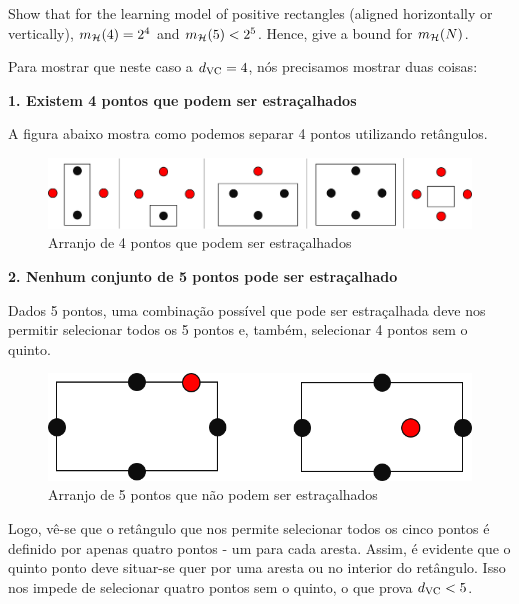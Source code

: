 \begin{enunciado}{2}
    Show that for the learning model of positive rectangles (aligned horizontally or vertically), $m_{\mathcal{H}}(4) = 2^4$ and $m_{\mathcal{H}}(5) < 2^5$. Hence, give a bound for $m_{\mathcal{H}}(N)$.
\end{enunciado}

Para mostrar que neste caso a $d_{\text{VC}} = 4$, nós precisamos mostrar duas coisas:

\textbf{1. Existem 4 pontos que podem ser estraçalhados}

A figura abaixo mostra como podemos separar 4 pontos utilizando retângulos.

\begin{figure}[h]
	\centering
	\begin{minipage}{0.46\textwidth}
		\centering
		\includegraphics[width=\textwidth]{images/2-2-dvc4.png}
		\caption{Arranjo de 4 pontos que podem ser estraçalhados}
	\end{minipage}
\end{figure}

\textbf{2. Nenhum conjunto de 5 pontos pode ser estraçalhado}

Dados 5 pontos, uma combinação possível que pode ser estraçalhada deve nos permitir selecionar todos os 5 pontos
e, também, selecionar 4 pontos sem o quinto.

\begin{figure}[h]
	\centering
	\begin{minipage}{0.45\textwidth}
		\centering
		\includegraphics[width=\textwidth]{images/2-2-dvc5.png}
		\caption{Arranjo de 5 pontos que não podem ser estraçalhados}
	\end{minipage}
\end{figure}

Logo, vê-se que o retângulo que nos permite selecionar todos os cinco pontos é definido por apenas quatro pontos
- um para cada aresta. Assim, é evidente que o quinto ponto deve situar-se quer por uma aresta ou no interior do
retângulo. Isso nos impede de selecionar quatro pontos sem o quinto, o que prova $d_{\text{VC}} < 5$.